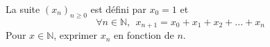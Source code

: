 \documentclass[a4paper,fleqn]{article}
\date{\today}
\begin{document}
La suite $(x_n)_{n\geq 0}$ est défini par $x_0 = 1$ et
\[
	\forall n \in \mathbb{N},~~ x_{n+1}=x_0+x_1+x_2+...+x_n
\]
Pour $x \in \mathbb{N}$, exprimer $x_n$ en fonction de $n$.
\end{document}
